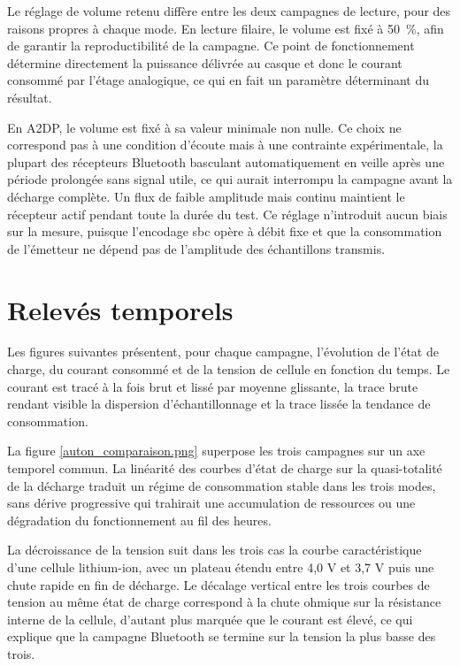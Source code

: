 Le réglage de volume retenu diffère entre les deux campagnes de lecture, pour des raisons propres à chaque mode. En lecture filaire, le volume est fixé à 50~\%, afin de garantir la reproductibilité de la campagne. Ce point de fonctionnement détermine directement la puissance délivrée au casque et donc le courant consommé par l'étage analogique, ce qui en fait un paramètre déterminant du résultat.

En A2DP, le volume est fixé à sa valeur minimale non nulle. Ce choix ne correspond pas à une condition d'écoute mais à une contrainte expérimentale, la plupart des récepteurs Bluetooth basculant automatiquement en veille après une période prolongée sans signal utile, ce qui aurait interrompu la campagne avant la décharge complète. Un flux de faible amplitude mais continu maintient le récepteur actif pendant toute la durée du test. Ce réglage n'introduit aucun biais sur la mesure, puisque l'encodage \gls{sbc} opère à débit fixe et que la consommation de l'émetteur ne dépend pas de l'amplitude des échantillons transmis.

\section{Relevés temporels}
\label{ann:autonomie:releves}

Les figures suivantes présentent, pour chaque campagne, l'évolution de l'état de charge, du courant consommé et de la tension de cellule en fonction du temps. Le courant est tracé à la fois brut et lissé par moyenne glissante, la trace brute rendant visible la dispersion d'échantillonnage et la trace lissée la tendance de consommation.




La figure \ref{auton_comparaison.png} superpose les trois campagnes sur un axe temporel commun. La linéarité des courbes d'état de charge sur la quasi-totalité de la décharge traduit un régime de consommation stable dans les trois modes, sans dérive progressive qui trahirait une accumulation de ressources ou une dégradation du fonctionnement au fil des heures.


La décroissance de la tension suit dans les trois cas la courbe caractéristique d'une cellule lithium-ion, avec un plateau étendu entre 4,0 V et 3,7 V puis une chute rapide en fin de décharge. Le décalage vertical entre les trois courbes de tension au même état de charge correspond à la chute ohmique sur la résistance interne de la cellule, d'autant plus marquée que le courant est élevé, ce qui explique que la campagne Bluetooth se termine sur la tension la plus basse des trois.